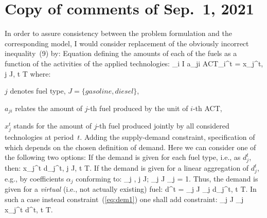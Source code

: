 \documentclass[a4paper,12pt]{article}
\begin{document}
\newpage
\section*{Copy of comments of Sep.~1, 2021}
In order to assure consistency between the problem formulation and the
corresponding model, I would consider replacement of the obviously incorrect
inequality~(9) by:
\inum Equation defining the amounts of each of the fuels as a function of
the activities of the applied technologies:
	\be
	\sum_{i \in I} a_{ji} \cdot ACT_i^t = x_j^t, \quad j \in J,\; t \in T
	\ee
	where:
	\btlbs
	\item $j$ denotes fuel type, $J = \{gasoline, diesel\}$,
	\item $a_{ji}$ relates the amount of $j$-th fuel produced by the unit of
		$i$-th ACT,
	\item $x_j^t$ stands for the amount of $j$-th fuel produced jointly by all
		considered technologies at period~$t$.
	\etls
\inum Adding the supply-demand constraint, specification of which depends on the
	chosen definition of demand. Here we can consider one of the following two options:
	\inums If the demand is given for each fuel type, i.e., as $d_j^t$, then:
		\be\label{eq:dem1}
		x_j^t \ge d_j^t, \quad j \in J,\; t \in T.
		\ee
	\inums If the demand is given for a linear aggregation of $d_j^t$, e.g.,
		by coefficients $\alpha_j$ conforming to:
		 \le \alpha_j ,\; \forall j \in J; \quad \sum_{j \in J} \alpha_j = 1.
		\ee
		Thus, the demand is given for a {\em virtual} (i.e., not actually existing)
		fuel:
		\be
			d^t = \sum_{j \in J} \alpha_j \cdot d_j^t, \quad t \in T.
		\ee
		In such a case instead constraint~(\ref{eq:dem1}) one shall add constraint:
		\be
		\sum_{j \in J} \alpha_j \cdot x_j^t \ge d^t, \quad t \in T.
		\ee
	\etls
\etl
\end{document}
